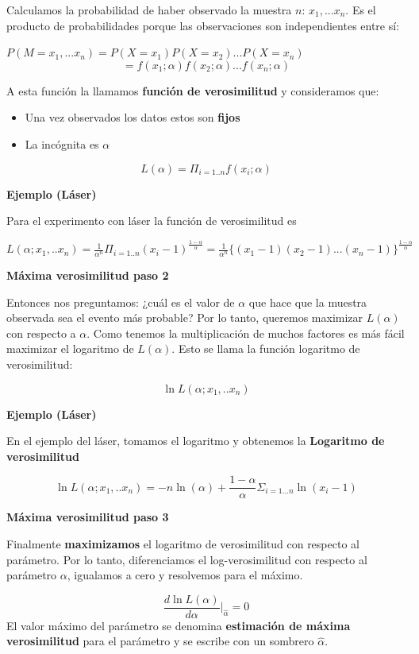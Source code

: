 \documentclass[
]{book}
\providecommand{\tightlist}{%
  \setlength{\itemsep}{0pt}\setlength{\parskip}{0pt}}
\begin{document}
Calculamos la probabilidad de haber observado la muestra \(n\): \(x_1,...x_n\). Es el producto de probabilidades porque las observaciones son independientes entre sí:

\(P(M=x_1,...x_n)=P(X=x_1)P(X=x_2)...P(X=x_n)\)
\[=f(x_1;\alpha)f(x_2;\alpha) ...f(x_n;\alpha)\]

A esta función la llamamos \textbf{función de verosimilitud} y consideramos que:

\begin{itemize}
\tightlist
\item
  Una vez observados los datos estos son \textbf{fijos}
\item
  La incógnita es \(\alpha\)
\end{itemize}

\[L(\alpha)= \Pi_{i=1..n} f(x_i; \alpha)\]

\textbf{Ejemplo (Láser)}

Para el experimento con láser la función de verosimilitud es

\(L(\alpha;x_1,..x_n)= \frac{1}{\alpha^n} \Pi_{i=1..n} (x_i-1)^{\frac{1-\alpha}{ \alpha}}= \frac{1}{\alpha^n} \{(x_1-1)(x_2-1)...(x_n-1)\}^{\frac{1-\alpha}{\alpha}}\)

\textbf{Máxima verosimilitud paso 2}

Entonces nos preguntamos: ¿cuál es el valor de \(\alpha\) que hace que la muestra observada sea el evento más probable? Por lo tanto, queremos maximizar \(L(\alpha)\) con respecto a \(\alpha\). Como tenemos la multiplicación de muchos factores es más fácil maximizar el logaritmo de \(L(\alpha)\). Esto se llama la función logaritmo de verosimilitud:

\[\ln L(\alpha;x_1,..x_n)\]

\textbf{Ejemplo (Láser)}

En el ejemplo del láser, tomamos el logaritmo y obtenemos la \textbf{Logaritmo de verosimilitud}

\[\ln L(\alpha;x_1,..x_n)= -n \ln(\alpha) + {\frac{1-\alpha}{\alpha}} \Sigma_{i=1...n} \ln (x_i-1)\]

\textbf{Máxima verosimilitud paso 3}

Finalmente \textbf{maximizamos} el logaritmo de verosimilitud con respecto al parámetro. Por lo tanto, diferenciamos el log-verosimilitud con respecto al parámetro \(\alpha\), igualamos a cero y resolvemos para el máximo.

\[\frac{d \ln L(\alpha)}{d \alpha} \big|_{\hat{\alpha}}=0 \]
El valor máximo del parámetro se denomina \textbf{estimación de máxima verosimilitud} para el parámetro y se escribe con un sombrero \(\hat{\alpha}\).
\end{document}
